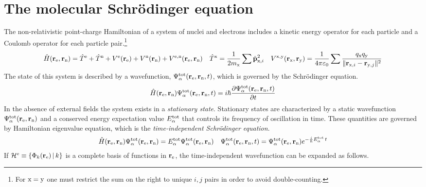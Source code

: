 \documentclass[11pt]{article}
\begin{document}
\setlength{\abovedisplayskip}{5pt}
\setlength{\belowdisplayskip}{5pt}


\section*{The molecular Schr\"odinger equation}

\begin{rmk}
The non-relativistic point-charge Hamiltonian of a system of nuclei and electrons includes a kinetic energy operator for each particle and a Coulomb operator for each particle pair.\footnote{
  For $\mathrm{x}=\mathrm{y}$ one must restrict the sum on the right to unique $i,j$ pairs in order to avoid double-counting.}
\begin{align}
  \op{H}(\bo{r}_\mr{e},\bo{r}_\mr{n})
=
  \op{T}^\mr{e}
+
  \op{T}^\mr{n}
+
  V^\mr{e}(\bo{r}_\mr{e})
+
  V^\mr{n}(\bo{r}_\mr{n})
+
  V^{\mr{e},\mr{n}}(\bo{r}_\mr{e},\bo{r}_\mr{n})
&&
  \op{T}^\mr{x}
=
  \fr{1}{2m_\mr{x}}
  \sum
  \op{\bo{p}}_{\mr{x},i}^2
&&
  V^{\mr{x},\mr{y}}(\bo{r}_\mr{x},\bo{r}_\mr{y})
=
  \fr{1}{4\pi \e_0}
  \sum
  \fr{
    q_\mr{x}q_\mr{y}
  }{
    \|\bo{r}_{\mr{x},i} - \bo{r}_{\mr{y},j}\|^2
  }
\end{align}
The state of this system is described by a wavefunction,
$\Psi _{\alpha }^{\mathrm{tot}}(\mathbf{r}_{\mathrm{e}},\mathbf{r}_{\mathrm{n}}, t)$, which is governed by the Schr\"odinger equation.
\begin{align}
  \hat{H}(\mathbf{r}_{\mathrm{e}},\mathbf{r}_{\mathrm{n}})
  \Psi _{\alpha }^{\mathrm{tot}}(\mathbf{r}_{\mathrm{e}},\mathbf{r}_{\mathrm{n}}, t)
=
  i
  \hbar
  \frac {\partial
    \Psi _{\alpha }^{\mathrm{tot}}(\mathbf{r}_{\mathrm{e}},\mathbf{r}_{\mathrm{n}}, t)
  }{\partial
    t
  }
\end{align}
In the absence of external fields the system exists in a \textit{stationary state}.
Stationary states are characterized by a static wavefunction $\Psi _{\alpha }^{\mathrm{tot}}(\mathbf{r}_{\mathrm{e}},\mathbf{r}_{\mathrm{n}})$ and a conserved energy expectation value $E_{\alpha }^{\mathrm{tot}}$ that controls its frequency of oscillation in time.
These quantities are governed by Hamiltonian eigenvalue equation, which is the \textit{time-independent Schr\"odinger equation}.
\begin{align}
\label{eq:molecular-schrodinger-equation}
  \hat{H}(\mathbf{r}_{\mathrm{e}},\mathbf{r}_{\mathrm{n}})
  \Psi _{\alpha }^{\mathrm{tot}}(\mathbf{r}_{\mathrm{e}},\mathbf{r}_{\mathrm{n}})
=
  E_{\alpha }^{\mathrm{tot}}
  \Psi _{\alpha }^{\mathrm{tot}}(\mathbf{r}_{\mathrm{e}},\mathbf{r}_{\mathrm{n}})
&&
  \Psi _{\alpha }^{\mathrm{tot}}(\mathbf{r}_{\mathrm{e}},\mathbf{r}_{\mathrm{n}}, t)
=
  \Psi _{\alpha }^{\mathrm{tot}}(\mathbf{r}_{\mathrm{e}},\mathbf{r}_{\mathrm{n}})
  e^{-\frac {i}{\hbar}E_{\alpha }^{\mathrm{tot}}\,t}
\end{align}
If $\mathcal{H}^{\mathrm{e}}\equiv\{\Phi _k(\mathbf{r}_{\mathrm{e}})\,|\,k\}$ is a complete basis of functions in $\mathbf{r}_{\mathrm{e}}$, the time-independent wavefunction can be expanded as follows.

\end{rmk}
\end{document}
